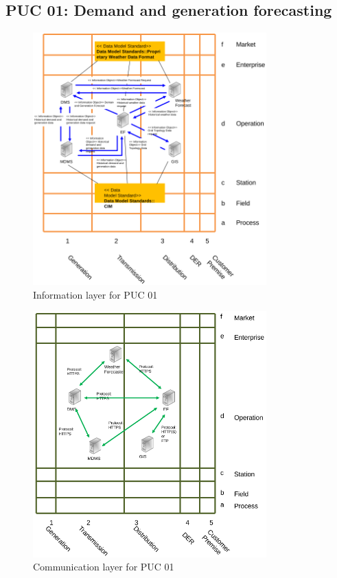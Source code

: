 \subsection{PUC 01: Demand and generation forecasting}


\begin{figure}[!htb]\centering
  \includegraphics[width=9cm]{Data/i1.png}
\caption{Information layer for PUC 01}
\label{fig:i1}
\end{figure}


\begin{figure}[!htb]\centering
  \includegraphics[width=9cm]{Data/c1.png}
\caption{Communication layer for PUC 01}
\label{fig:c1}
\end{figure}






